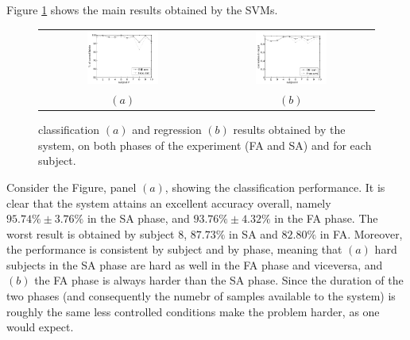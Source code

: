 Figure \ref{fig:results} shows the main results obtained by the SVMs.

\begin{figure}[!ht] \centering
  \begin{tabular}{cc}
    \includegraphics[width=0.45\textwidth]{figs/perfClass} &
    \includegraphics[width=0.45\textwidth]{figs/perfRegr} \\
    $(a)$ & $(b)$ \\
  \end{tabular}
  \caption{classification $(a)$ and regression $(b)$ results obtained
    by the system, on both phases of the experiment (FA and SA) and
    for each subject.}
  \label{fig:results}
\end{figure}

Consider the Figure, panel $(a)$, showing the classification
performance. It is clear that the system attains an excellent accuracy
overall, namely $95.74\% \pm 3.76\%$ in the SA phase, and $93.76\% \pm
4.32\%$ in the FA phase. The worst result is obtained by subject $8$,
$87.73\%$ in SA and $82.80\%$ in FA. Moreover, the performance is
consistent by subject and by phase, meaning that $(a)$ hard subjects
in the SA phase are hard as well in the FA phase and viceversa, and
$(b)$ the FA phase is always harder than the SA phase. Since the
duration of the two phases (and consequently the numebr of samples
available to the system) is roughly the same less controlled
conditions make the problem harder, as one would expect.

